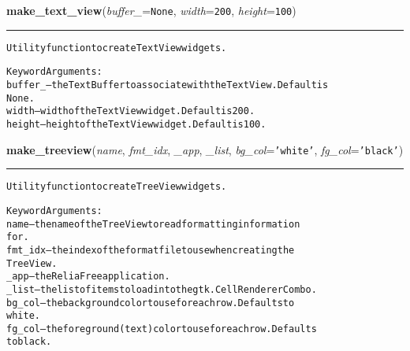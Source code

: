     \label{reliafree:widgets:make_text_view}

    \vspace{0.5ex}

\hspace{.8\funcindent}\begin{boxedminipage}{\funcwidth}

    \raggedright \textbf{make\_text\_view}(\textit{buffer\_}={\tt None}, \textit{width}={\tt 200}, \textit{height}={\tt 100})

    \vspace{-1.5ex}

    \rule{\textwidth}{0.5\fboxrule}
\setlength{\parskip}{2ex}
\begin{alltt}
Utility function to create TextView widgets.

Keyword Arguments:
buffer\_ -- the TextBuffer to associate with the TextView.  Default is
           None.
width   -- width of the TextView widget.  Default is 200.
height  -- height of the TextView widget.  Default is 100.
\end{alltt}

\setlength{\parskip}{1ex}
    \end{boxedminipage}

    \label{reliafree:widgets:make_treeview}

    \vspace{0.5ex}

\hspace{.8\funcindent}\begin{boxedminipage}{\funcwidth}

    \raggedright \textbf{make\_treeview}(\textit{name}, \textit{fmt\_idx}, \textit{\_app}, \textit{\_list}, \textit{bg\_col}={\tt \texttt{'}\texttt{white}\texttt{'}}, \textit{fg\_col}={\tt \texttt{'}\texttt{black}\texttt{'}})

    \vspace{-1.5ex}

    \rule{\textwidth}{0.5\fboxrule}
\setlength{\parskip}{2ex}
\begin{alltt}
Utility function to create TreeView widgets.

Keyword Arguments:
name    -- the name of the TreeView to read formatting information
           for.
fmt\_idx -- the index of the format file to use when creating the
           TreeView.
\_app    -- the ReliaFree application.
\_list   -- the list of items to load into the gtk.CellRendererCombo.
bg\_col  -- the background color to use for each row.  Defaults to
           white.
fg\_col  -- the foreground (text) color to use for each row.  Defaults
           to black.
\end{alltt}

\setlength{\parskip}{1ex}
    \end{boxedminipage}

